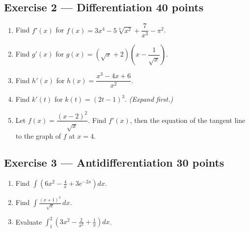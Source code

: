 \documentclass[11pt]{article}
\begin{document}
\newpage
\subsection*{Exercise 2 --- Differentiation \hfill {\normalsize\color{fnavy}40 points}}
\begin{enumerate}[label=\textbf{(\alph*)},leftmargin=*,itemsep=4pt]
\item Find $f'(x)$ for $f(x)=3x^4-5\sqrt[3]{x^2}+\dfrac{7}{x^3}-\pi^2$. \answerspace{3.2cm}
\item Find $g'(x)$ for $g(x)=\left(\sqrt{x}+2\right)\left(x-\dfrac{1}{\sqrt{x}}\right)$. \answerspace{3.2cm}
\item Find $h'(x)$ for $h(x)=\dfrac{x^3-4x+6}{x^2}$. \answerspace{3.2cm}
\item Find $k'(t)$ for $k(t)=(2t-1)^3$. \emph{(Expand first.)} \answerspace{3.2cm}
\item Let $f(x)=\dfrac{(x-2)^2}{\sqrt{x}}$. Find $f'(x)$, then the equation of the tangent line to the graph of $f$ at $x=4$. \answerspace{4cm}
\end{enumerate}

\newpage
\subsection*{Exercise 3 --- Antidifferentiation \hfill {\normalsize\color{fnavy}30 points}}
\begin{enumerate}[label=\textbf{(\alph*)},leftmargin=*,itemsep=4pt]
\item Find $\displaystyle\int\left(6x^2-\frac{4}{x}+3e^{-2x}\right)dx$. \answerspace{5cm}
\item Find $\displaystyle\int\frac{(x+1)^2}{\sqrt{x}}\,dx$. \answerspace{5cm}
\item Evaluate $\displaystyle\int_{1}^{2}\left(3x^2-\frac{2}{x^2}+\frac{1}{x}\right)dx$. \answerspace{4cm}
\end{enumerate}
\end{document}
